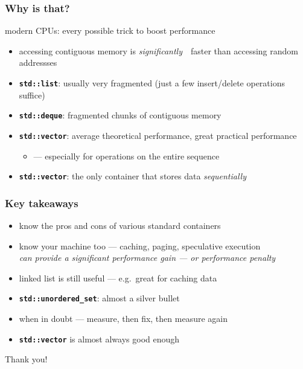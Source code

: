 \documentclass[aspectratio=169]{beamer}
\newcommand{\greenemph}[1]{\textit{\textcolor{clGreen}{#1}}}
\newcommand{\cpp}[1]{\texttt{\textbf{\textcolor{clCodeBlue}{#1}}}}
\begin{document}
\begin{frame}
\frametitle{Why is that?}
{\Large \textcolor{clViolet}{modern CPUs: every possible trick to boost performance}}
\vspace*{12pt}
\begin{itemize}
  \item{} accessing contiguous memory is \greenemph{significantly}~~faster than accessing random addressses
  \vspace*{18pt}
  \item{} \cpp{std::list}: usually very fragmented (just a few insert/delete operations suffice)
  \item{} \cpp{std::deque}: fragmented chunks of contiguous memory
  \item{} \cpp{std::vector}: average theoretical performance, great practical performance \\
  \begin{itemize}
    \item{} --- especially for operations on the entire sequence
  \end{itemize}
  \item{} \cpp{std::vector}: the only container that stores data \greenemph{sequentially}
\end{itemize}
\end{frame}

\begin{frame}
\frametitle{Key takeaways}
{\centering
\begin{itemize}
  \item{} know the pros and cons of various standard containers
  \item{} know your machine too --- caching, paging, speculative execution \\
  \greenemph{can provide a significant performance gain --- or performance penalty}
  \item{} linked list is still useful --- e.g.\ great for caching data
  \item{} \cpp{std::unordered\_set}: almost a silver bullet
  \item{} when in doubt --- measure, then fix, then measure again
  \item{} \cpp{std::vector} is almost always good enough
\end{itemize}

\vspace{2ex}
\begin{center}{\Large Thank you!}\end{center}
}
\end{frame}
\end{document}
